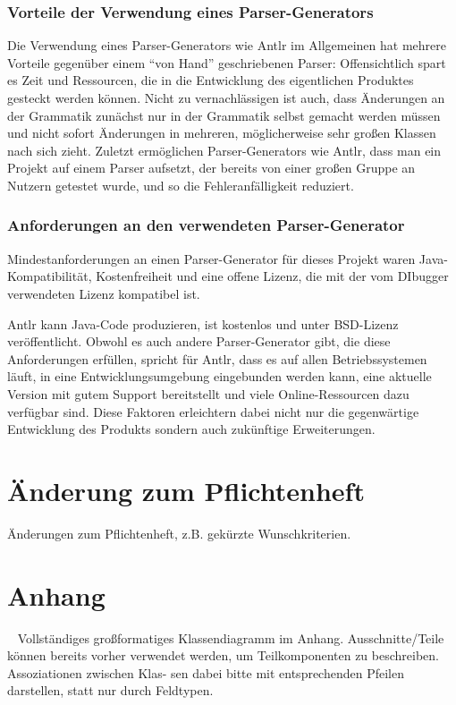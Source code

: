 \documentclass[parskip=full]{scrartcl}
\begin{document}

\subsubsection{Vorteile der Verwendung eines Parser-Generators}
Die Verwendung eines Parser-Generators wie Antlr im Allgemeinen hat mehrere Vorteile gegenüber einem “von Hand” geschriebenen Parser: Offensichtlich spart es Zeit und Ressourcen, die in die Entwicklung des eigentlichen Produktes gesteckt werden können. Nicht zu vernachlässigen ist auch, dass Änderungen an der Grammatik zunächst nur in der Grammatik selbst gemacht werden müssen und nicht sofort Änderungen in mehreren, möglicherweise sehr großen Klassen nach sich zieht. Zuletzt ermöglichen Parser-Generators wie Antlr, dass man ein Projekt auf einem Parser aufsetzt, der bereits von einer großen Gruppe an Nutzern getestet wurde, und so die Fehleranfälligkeit reduziert.


\subsubsection{Anforderungen an den verwendeten Parser-Generator}

Mindestanforderungen an einen Parser-Generator für dieses Projekt waren Java-Kompatibilität, Kostenfreiheit und eine offene Lizenz, die mit der vom DIbugger verwendeten Lizenz kompatibel ist.

Antlr kann Java-Code produzieren, ist kostenlos und unter BSD-Lizenz veröffentlicht.
Obwohl es auch andere Parser-Generator gibt, die diese Anforderungen erfüllen, spricht für Antlr, dass es auf allen Betriebssystemen läuft, in eine Entwicklungsumgebung eingebunden werden kann, eine aktuelle Version mit gutem Support bereitstellt und viele Online-Ressourcen dazu verfügbar sind.
Diese Faktoren erleichtern dabei nicht nur die gegenwärtige Entwicklung des Produkts sondern auch zukünftige Erweiterungen.

\section{Änderung zum Pflichtenheft}
Änderungen zum Pflichtenheft, z.B. gekürzte Wunschkriterien.




\section{Anhang}\
Vollständiges großformatiges Klassendiagramm im Anhang. Ausschnitte/Teile können bereits
vorher verwendet werden, um Teilkomponenten zu beschreiben. Assoziationen zwischen Klas-
sen dabei bitte mit entsprechenden Pfeilen darstellen, statt nur durch Feldtypen.
\end{document}
